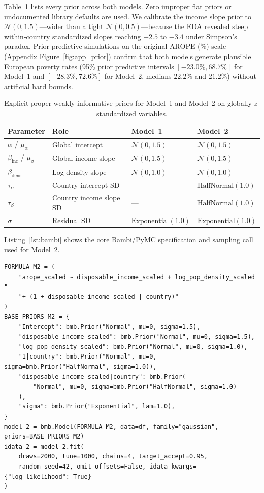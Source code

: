 \documentclass[11pt,a4paper]{article}
\begin{document}
Table~\ref{tab:priors} lists every prior across both models. Zero improper flat priors or undocumented library defaults are used. We calibrate the income slope prior to $\mathcal{N}(0, 1.5)$---wider than a tight $\mathcal{N}(0, 0.5)$---because the EDA revealed steep within-country standardized slopes reaching $-2.5$ to $-3.4$ under Simpson's paradox. Prior predictive simulations on the original AROPE (\%) scale (Appendix Figure~\ref{fig:app_prior}) confirm that both models generate plausible European poverty rates (95\% prior predictive intervals $[-23.0\%, 68.7\%]$ for Model~1 and $[-28.3\%, 72.6\%]$ for Model~2, medians $22.2\%$ and $21.2\%$) without artificial hard bounds.

\begin{table}[H]
\centering
\caption{Explicit proper weakly informative priors for Model~1 and Model~2 on globally $z$-standardized variables.}
\label{tab:priors}
\begin{tabular}{llll}
\toprule
Parameter & Role & Model~1 & Model~2 \\
\midrule
$\alpha$ / $\mu_\alpha$ & Global intercept & $\mathcal{N}(0, 1.5)$ & $\mathcal{N}(0, 1.5)$ \\
$\beta_{\text{inc}}$ / $\mu_\beta$ & Global income slope & $\mathcal{N}(0, 1.5)$ & $\mathcal{N}(0, 1.5)$ \\
$\beta_{\text{dens}}$ & Log density slope & $\mathcal{N}(0, 1.0)$ & $\mathcal{N}(0, 1.0)$ \\
$\tau_\alpha$ & Country intercept SD & --- & $\text{HalfNormal}(1.0)$ \\
$\tau_\beta$ & Country income slope SD & --- & $\text{HalfNormal}(1.0)$ \\
$\sigma$ & Residual SD & $\text{Exponential}(1.0)$ & $\text{Exponential}(1.0)$ \\
\bottomrule
\end{tabular}
\end{table}

Listing~\ref{lst:bambi} shows the core Bambi/PyMC specification and sampling call used for Model~2.

\begin{lstlisting}[style=pybda,caption={Bambi specification and NUTS sampling configuration for Model~2 (PyMC 5.12 / Bambi 0.13).},label={lst:bambi}]
FORMULA_M2 = (
    "arope_scaled ~ disposable_income_scaled + log_pop_density_scaled "
    "+ (1 + disposable_income_scaled | country)"
)
BASE_PRIORS_M2 = {
    "Intercept": bmb.Prior("Normal", mu=0, sigma=1.5),
    "disposable_income_scaled": bmb.Prior("Normal", mu=0, sigma=1.5),
    "log_pop_density_scaled": bmb.Prior("Normal", mu=0, sigma=1.0),
    "1|country": bmb.Prior("Normal", mu=0, sigma=bmb.Prior("HalfNormal", sigma=1.0)),
    "disposable_income_scaled|country": bmb.Prior(
        "Normal", mu=0, sigma=bmb.Prior("HalfNormal", sigma=1.0)
    ),
    "sigma": bmb.Prior("Exponential", lam=1.0),
}
model_2 = bmb.Model(FORMULA_M2, data=df, family="gaussian", priors=BASE_PRIORS_M2)
idata_2 = model_2.fit(
    draws=2000, tune=1000, chains=4, target_accept=0.95,
    random_seed=42, omit_offsets=False, idata_kwargs={"log_likelihood": True}
)
\end{lstlisting}
\end{document}
